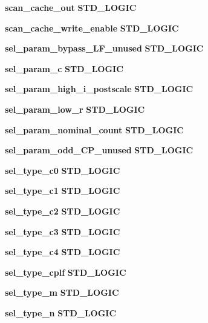 \begin{DoxyCompactItemize}
\item 
{\bf scan\+\_\+cache\+\_\+out} {\bfseries \textcolor{comment}{S\+T\+D\+\_\+\+L\+O\+G\+IC}\textcolor{vhdlchar}{ }} 
\item 
{\bf scan\+\_\+cache\+\_\+write\+\_\+enable} {\bfseries \textcolor{comment}{S\+T\+D\+\_\+\+L\+O\+G\+IC}\textcolor{vhdlchar}{ }} 
\item 
{\bf sel\+\_\+param\+\_\+bypass\+\_\+\+L\+F\+\_\+unused} {\bfseries \textcolor{comment}{S\+T\+D\+\_\+\+L\+O\+G\+IC}\textcolor{vhdlchar}{ }} 
\item 
{\bf sel\+\_\+param\+\_\+c} {\bfseries \textcolor{comment}{S\+T\+D\+\_\+\+L\+O\+G\+IC}\textcolor{vhdlchar}{ }} 
\item 
{\bf sel\+\_\+param\+\_\+high\+\_\+i\+\_\+postscale} {\bfseries \textcolor{comment}{S\+T\+D\+\_\+\+L\+O\+G\+IC}\textcolor{vhdlchar}{ }} 
\item 
{\bf sel\+\_\+param\+\_\+low\+\_\+r} {\bfseries \textcolor{comment}{S\+T\+D\+\_\+\+L\+O\+G\+IC}\textcolor{vhdlchar}{ }} 
\item 
{\bf sel\+\_\+param\+\_\+nominal\+\_\+count} {\bfseries \textcolor{comment}{S\+T\+D\+\_\+\+L\+O\+G\+IC}\textcolor{vhdlchar}{ }} 
\item 
{\bf sel\+\_\+param\+\_\+odd\+\_\+\+C\+P\+\_\+unused} {\bfseries \textcolor{comment}{S\+T\+D\+\_\+\+L\+O\+G\+IC}\textcolor{vhdlchar}{ }} 
\item 
{\bf sel\+\_\+type\+\_\+c0} {\bfseries \textcolor{comment}{S\+T\+D\+\_\+\+L\+O\+G\+IC}\textcolor{vhdlchar}{ }} 
\item 
{\bf sel\+\_\+type\+\_\+c1} {\bfseries \textcolor{comment}{S\+T\+D\+\_\+\+L\+O\+G\+IC}\textcolor{vhdlchar}{ }} 
\item 
{\bf sel\+\_\+type\+\_\+c2} {\bfseries \textcolor{comment}{S\+T\+D\+\_\+\+L\+O\+G\+IC}\textcolor{vhdlchar}{ }} 
\item 
{\bf sel\+\_\+type\+\_\+c3} {\bfseries \textcolor{comment}{S\+T\+D\+\_\+\+L\+O\+G\+IC}\textcolor{vhdlchar}{ }} 
\item 
{\bf sel\+\_\+type\+\_\+c4} {\bfseries \textcolor{comment}{S\+T\+D\+\_\+\+L\+O\+G\+IC}\textcolor{vhdlchar}{ }} 
\item 
{\bf sel\+\_\+type\+\_\+cplf} {\bfseries \textcolor{comment}{S\+T\+D\+\_\+\+L\+O\+G\+IC}\textcolor{vhdlchar}{ }} 
\item 
{\bf sel\+\_\+type\+\_\+m} {\bfseries \textcolor{comment}{S\+T\+D\+\_\+\+L\+O\+G\+IC}\textcolor{vhdlchar}{ }} 
\item 
{\bf sel\+\_\+type\+\_\+n} {\bfseries \textcolor{comment}{S\+T\+D\+\_\+\+L\+O\+G\+IC}\textcolor{vhdlchar}{ }} 

\end{DoxyCompactItemize}
